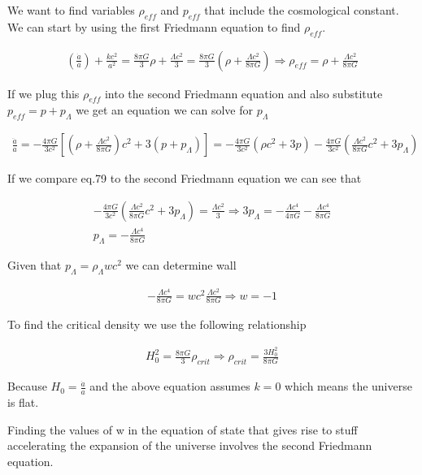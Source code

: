 \documentclass[a4paper]{article}
\begin{document}
We want to find variables $\rho_{eff}$ and $p_{eff}$ that include the cosmological constant. We can start by using the first Friedmann equation to find $\rho_{eff}$.

\begin{align}
    \left ( \frac{\dot{a}}{a}\right ) + \frac{kc^2}{a^2} = \frac{8 \pi G}{3} \rho + \frac{\Lambda c^2}{3} = \frac{8 \pi G}{3}\left ( \rho + \frac{\Lambda c^2}{8 \pi G}\right ) \Rightarrow \rho_{eff} =  \rho + \frac{\Lambda c^2}{8 \pi G}
\end{align}

If we plug this $\rho_{eff}$ into the second Friedmann equation and also substitute $p_{eff} = p + p_\Lambda$ we get an equation we can solve for $p_\Lambda$

\begin{align}
    \frac{\ddot{a}}{a} = -\frac{4\pi G}{3c^2} \left [ \left ( \rho + \frac{\Lambda c^2}{8 \pi G}\right )c^2 + 3(p+p_\Lambda)\right ] = -\frac{4\pi G}{3c^2}(\rho c^2 + 3p) - \frac{4\pi G}{3c^2} \left (\frac{\Lambda c^2}{8 \pi G}c^2 + 3p_\Lambda \right )
\end{align}

If we compare eq.79 to the second Friedmann equation we can see that 

\begin{align}
    - \frac{4\pi G}{3c^2} \left (\frac{\Lambda c^2}{8 \pi G}c^2 + 3p_\Lambda \right ) = \frac{\Lambda c^2}{3} \Rightarrow 3p_\Lambda = - \frac{\Lambda c^4}{4\pi G} - \frac{\Lambda c^4}{8\pi G} \\
    p_\Lambda = - \frac{\Lambda c^4}{8 \pi G} 
\end{align}

Given that $p_\Lambda = \rho_\Lambda w c^2$ we can determine wall

\begin{align}
    -\frac{\Lambda c^4}{8 \pi G} = w c^2 \frac{\Lambda c^2}{8 \pi G} \Rightarrow w = -1
\end{align}

To find the critical density we use the following relationship

\begin{align}
    H_0^2 = \frac{8 \pi G}{3} \rho_{crit} \Rightarrow \rho_{crit} = \frac{3H_0^2}{8\pi G}
\end{align}

Because $H_0 = \frac{\dot{a}}{a}$ and the above equation assumes $k=0$ which means the universe is flat. 

Finding the values of w in the equation of state that gives rise to stuff accelerating the expansion of the universe involves the second Friedmann equation.
\end{document}
